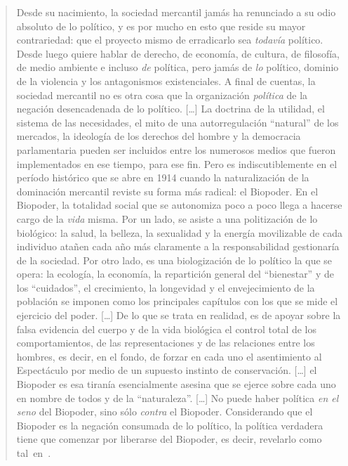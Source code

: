 \begin{quote}
  Desde su nacimiento, la sociedad mercantil jamás ha renunciado a su odio absoluto de lo político, y es por mucho en esto que reside su mayor contrariedad: que el proyecto mismo de erradicarlo sea \emph{todavía} político. Desde luego quiere hablar de derecho, de economía, de cultura, de filosofía, de medio ambiente e incluso \emph{de} política, pero jamás de \emph{lo} político, dominio de la violencia y los antagonismos existenciales. A final de cuentas, la sociedad mercantil no es otra cosa que la organización \emph{política} de la negación desencadenada de lo político. [\ldots] La doctrina de la utilidad, el sistema de las necesidades, el mito de una autorregulación \enquote{natural} de los mercados, la ideología de los derechos del hombre y la democracia parlamentaria pueden ser incluidos entre los numerosos medios que fueron implementados en ese tiempo, para ese fin. Pero es indiscutiblemente en el período histórico que se abre en 1914 cuando la naturalización de la dominación mercantil reviste su forma más radical: el Biopoder. En el Biopoder, la totalidad social que se autonomiza poco a poco llega a hacerse cargo de la \emph{vida} misma. Por un lado, se asiste a una politización de lo biológico: la salud, la belleza, la sexualidad y la energía movilizable de cada individuo atañen cada año más claramente a la responsabilidad gestionaría de la sociedad. Por otro lado, es una biologización de lo político la que se opera: la ecología, la economía, la repartición general del \enquote{bienestar} y de los \enquote{cuidados}, el crecimiento, la longevidad y el envejecimiento de la población se imponen como los principales capítulos con los que se mide el ejercicio del poder. [\ldots] De lo que se trata en realidad, es de apoyar sobre la falsa evidencia del cuerpo y de la vida biológica el control total de los comportamientos, de las representaciones y de las relaciones entre los hombres, es decir, en el fondo, de forzar en cada uno el asentimiento al Espectáculo por medio de un supuesto instinto de conservación. [\ldots] el Biopoder es esa tiranía esencialmente asesina que se ejerce sobre cada uno en nombre de todos y de la \enquote{naturaleza}. [\ldots] No puede haber política \emph{en el seno} del Biopoder, sino sólo \emph{contra} el Biopoder. Considerando que el Biopoder es la negación consumada de lo político, la política verdadera tiene que comenzar por liberarse del Biopoder, es decir, revelarlo como tal~en~\autocite[Tesis V]{tiqqunTesisSobrePartido}.
\end{quote}

